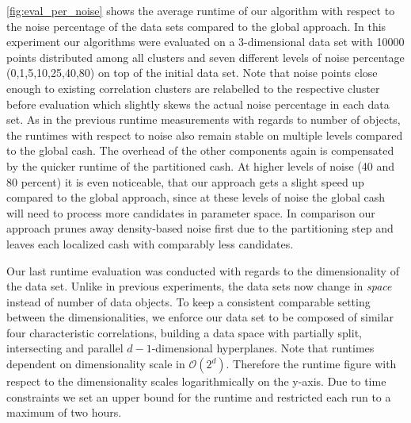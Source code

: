 \autoref{fig:eval_per_noise} shows the average runtime of our algorithm with respect to the noise percentage of the data sets compared to the global approach. In this experiment our algorithms were evaluated on a 3-dimensional data set with 10000 points distributed among all clusters and seven different levels of noise percentage (0,1,5,10,25,40,80) on top of the initial data set. Note that noise points close enough to existing correlation clusters are relabelled to the respective cluster before evaluation which slightly skews the actual noise percentage in each data set.
As in the previous runtime measurements with regards to number of objects, the runtimes with respect to noise also remain stable on multiple levels compared to the global \gls{cash}. The overhead of the other components again is compensated by the quicker runtime of the partitioned \gls{cash}. At higher levels of noise (40 and 80 percent) it is even noticeable, that our approach gets a slight speed up compared to the global approach, since at these levels of noise the global cash will need to process more candidates in parameter space. In comparison our approach prunes away density-based noise first due to the partitioning step and leaves each localized \gls{cash} with comparably less candidates.

Our last runtime evaluation was conducted with regards to the dimensionality of the data set. Unlike in previous experiments, the data sets now change in \textit{space} instead of number of data objects. To keep a consistent comparable setting between the dimensionalities, we enforce our data set to be composed of similar four characteristic correlations, building a data space with partially split, intersecting and parallel $d-1$-dimensional hyperplanes. 
Note that runtimes dependent on dimensionality scale in $\mathcal{O}(2^d)$. Therefore the runtime figure with respect to the dimensionality scales logarithmically on the y-axis. Due to time constraints we set an upper bound for the runtime and restricted each run to a maximum of two hours. 

